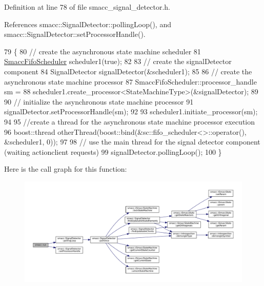 Definition at line 78 of file smacc\+\_\+signal\+\_\+detector.\+h.



References smacc\+::\+Signal\+Detector\+::polling\+Loop(), and smacc\+::\+Signal\+Detector\+::set\+Processor\+Handle().


\begin{DoxyCode}
79 \{
80     \textcolor{comment}{// create the asynchronous state machine scheduler}
81     \hyperlink{smacc__fifo__scheduler_8h_a0063e275231c80d5f97df21d17257bf7}{SmaccFifoScheduler} scheduler1(\textcolor{keyword}{true});
82 
83     \textcolor{comment}{// create the signalDetector component}
84     SignalDetector signalDetector(&scheduler1);
85 
86     \textcolor{comment}{// create the asynchronous state machine processor}
87     SmaccFifoScheduler::processor\_handle sm =
88         scheduler1.create\_processor<StateMachineType>(&signalDetector);
89 
90     \textcolor{comment}{// initialize the asynchronous state machine processor}
91     signalDetector.setProcessorHandle(sm);
92 
93     scheduler1.initiate\_processor(sm);
94 
95     \textcolor{comment}{//create a thread for the asynchronous state machine processor execution}
96     boost::thread otherThread(boost::bind(&sc::fifo\_scheduler<>::operator(), &scheduler1, 0));
97 
98     \textcolor{comment}{// use the  main thread for the signal detector component (waiting actionclient requests)}
99     signalDetector.pollingLoop();
100 \}
\end{DoxyCode}
Here is the call graph for this function\+:
\nopagebreak
\begin{figure}[H]
\begin{center}
\leavevmode
\includegraphics[width=350pt]{namespacesmacc_a47ac3b8d2968b1ba4152afd64ab66bd0_cgraph}
\end{center}
\end{figure}
\mbox{\label{namespacesmacc_afd94fcb8f8c410a0ced7954bf76e845d}} 
